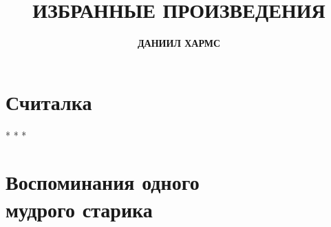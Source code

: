 \documentclass[a4paper,12pt]{article}
\begin{document}
\title{\Huge\bfseries\MakeUppercase{Избранные произведения}}
\author{\LARGE\bfseries\MakeUppercase{Даниил Хармс}}
\date{}
\maketitle

\section*{Считалка}


\vspace{0.3cm}
\begin{center}
* * *
\end{center}
\vspace{0.3cm}

\section*{Воспоминания одного\protect \\ мудрого старика}

\end{document}
